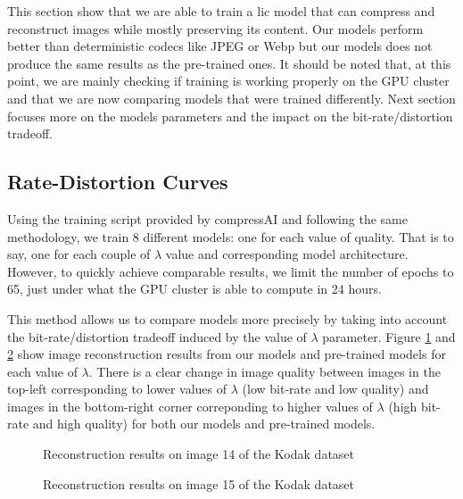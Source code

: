 This section show that we are able to train a \acrshort{lic} model that can compress and reconstruct images while mostly preserving its content. Our models perform better than deterministic codecs like JPEG or Webp but our models does not produce the same results as the pre-trained ones. It should be noted that, at this point, we are mainly checking if training is working properly on the GPU cluster and that we are now comparing models that were trained differently. Next section focuses more on the models parameters and the impact on the bit-rate/distortion tradeoff.

\subsection{Rate-Distortion Curves}
Using the training script provided by compressAI and following the same methodology, we train 8 different models: one for each value of \textsf{quality}. That is to say, one for each couple of \(\lambda\) value and corresponding model architecture. However, to quickly achieve comparable results, we limit the number of epochs to 65, just under what the GPU cluster is able to compute in 24 hours.

This method allows us to compare models more precisely by taking into account the bit-rate/distortion tradeoff induced by the value of \(\lambda\) parameter. Figure \ref{bdpsnr_1} and \ref{bdpsnr_2} show image reconstruction results from our models and pre-trained models for each value of \(\lambda\). There is a clear change in image quality between images in the top-left corresponding to lower values of \(\lambda\) (low bit-rate and low quality) and images in the bottom-right corner correponding to higher values of \(\lambda\) (high bit-rate and high quality) for both our models and pre-trained models.

\begin{figure}[H]
    \centering
    \caption{Reconstruction results on image 14 of the Kodak dataset}
    \label{bdpsnr_1}
\end{figure}

\begin{figure}[H]
    \centering
    \caption{Reconstruction results on image 15 of the Kodak dataset}
    \label{bdpsnr_2}
\end{figure}

